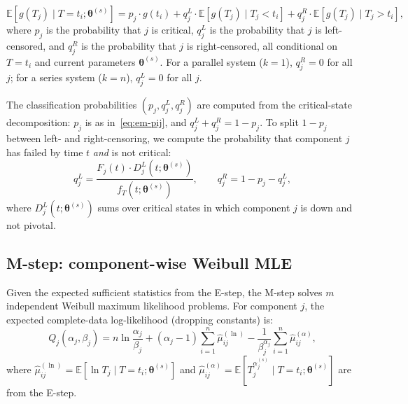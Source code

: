 \documentclass[12pt]{article}
\theoremstyle{definition}
\theoremstyle{remark}
\newcommand{\E}{\mathbb{E}}
\newcommand{\btheta}{\bm{\theta}}
\begin{document}
\begin{equation}\label{eq:em-marginalized}
  \E[g(T_j) \mid T = t_i; \btheta^{(s)}]
  = p_j \cdot g(t_i)
  + q_j^L \cdot \E[g(T_j) \mid T_j < t_i]
  + q_j^R \cdot \E[g(T_j) \mid T_j > t_i],
\end{equation}
where $p_j$ is the probability that $j$ is critical, $q_j^L$ is
the probability that $j$ is left-censored, and $q_j^R$ is the
probability that $j$ is right-censored, all conditional on
$T = t_i$ and current parameters $\btheta^{(s)}$.  For a parallel
system ($k = 1$), $q_j^R = 0$ for all $j$; for a series system
($k = n$), $q_j^L = 0$ for all $j$.

The classification probabilities $(p_j, q_j^L, q_j^R)$ are
computed from the critical-state decomposition:
$p_j$ is as in~\eqref{eq:em-pij}, and $q_j^L + q_j^R = 1 - p_j$.
To split $1 - p_j$ between left- and right-censoring, we compute
the probability that component $j$ has failed by time $t$
\emph{and} is not critical:
\begin{equation}\label{eq:em-qjL}
  q_j^L = \frac{F_j(t) \cdot D_j^L(t; \btheta^{(s)})}
               {f_T(t; \btheta^{(s)})},
  \qquad
  q_j^R = 1 - p_j - q_j^L,
\end{equation}
where $D_j^L(t; \btheta^{(s)})$ sums over critical states in
which component $j$ is down and not pivotal.

\subsection{M-step: component-wise Weibull MLE}

Given the expected sufficient statistics from the E-step, the
M-step solves $m$ independent Weibull maximum likelihood problems.
For component $j$, the expected complete-data log-likelihood
(dropping constants) is:
\begin{equation}\label{eq:em-mstep-obj}
  Q_j(\alpha_j, \beta_j)
  = n \ln \frac{\alpha_j}{\beta_j}
  + (\alpha_j - 1) \sum_{i=1}^n \hat\mu_{ij}^{(\ln)}
  - \frac{1}{\beta_j^{\alpha_j}} \sum_{i=1}^n \hat\mu_{ij}^{(\alpha)},
\end{equation}
where
$\hat\mu_{ij}^{(\ln)} = \E[\ln T_j \mid T = t_i; \btheta^{(s)}]$
and
$\hat\mu_{ij}^{(\alpha)} = \E[T_j^{\alpha_j^{(s)}} \mid T = t_i;
\btheta^{(s)}]$
are from the E-step.
\end{document}
